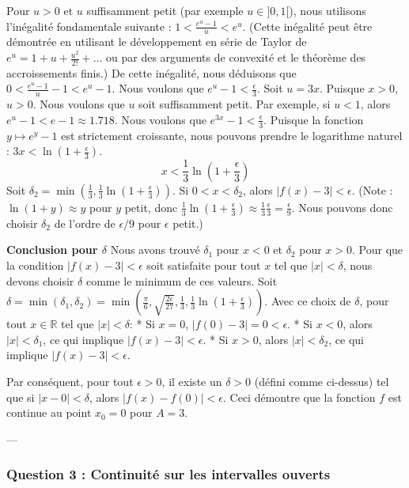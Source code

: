 \documentclass[12pt,a4paper]{report}
\begin{document}
Pour $u > 0$ et $u$ suffisamment petit (par exemple $u \in ]0, 1[$), nous utilisons l'inégalité fondamentale suivante :
$1 < \frac{e^u - 1}{u} < e^u$.
(Cette inégalité peut être démontrée en utilisant le développement en série de Taylor de $e^u = 1 + u + \frac{u^2}{2!} + \dots$ ou par des arguments de convexité et le théorème des accroissements finis.)
De cette inégalité, nous déduisons que $0 < \frac{e^u - 1}{u} - 1 < e^u - 1$.
Nous voulons que $e^u - 1 < \frac{\epsilon}{3}$.
Soit $u = 3x$. Puisque $x > 0$, $u > 0$.
Nous voulons que $u$ soit suffisamment petit. Par exemple, si $u < 1$, alors $e^u - 1 < e - 1 \approx 1.718$.
Nous voulons que $e^{3x} - 1 < \frac{\epsilon}{3}$.
Puisque la fonction $y \mapsto e^y - 1$ est strictement croissante, nous pouvons prendre le logarithme naturel :
$3x < \ln\left(1 + \frac{\epsilon}{3}\right)$.
$$ x < \frac{1}{3} \ln\left(1 + \frac{\epsilon}{3}\right) $$
Soit $\delta_2 = \min\left(\frac{1}{3}, \frac{1}{3} \ln\left(1 + \frac{\epsilon}{3}\right)\right)$. Si $0 < x < \delta_2$, alors $|f(x) - 3| < \epsilon$.
(Note : $\ln(1+y) \approx y$ pour $y$ petit, donc $\frac{1}{3} \ln(1+\frac{\epsilon}{3}) \approx \frac{1}{3} \frac{\epsilon}{3} = \frac{\epsilon}{9}$. Nous pouvons donc choisir $\delta_2$ de l'ordre de $\epsilon/9$ pour $\epsilon$ petit.)

\textbf{Conclusion pour $\delta$}
Nous avons trouvé $\delta_1$ pour $x<0$ et $\delta_2$ pour $x>0$.
Pour que la condition $|f(x) - 3| < \epsilon$ soit satisfaite pour tout $x$ tel que $|x| < \delta$, nous devons choisir $\delta$ comme le minimum de ces valeurs.
Soit $\delta = \min\left(\delta_1, \delta_2\right) = \min\left(\frac{\pi}{6}, \sqrt{\frac{2\epsilon}{27}}, \frac{1}{3}, \frac{1}{3} \ln\left(1 + \frac{\epsilon}{3}\right)\right)$.
Avec ce choix de $\delta$, pour tout $x \in \mathbb{R}$ tel que $|x| < \delta$:
*   Si $x=0$, $|f(0)-3|=0 < \epsilon$.
*   Si $x<0$, alors $|x| < \delta_1$, ce qui implique $|f(x)-3| < \epsilon$.
*   Si $x>0$, alors $|x| < \delta_2$, ce qui implique $|f(x)-3| < \epsilon$.

Par conséquent, pour tout $\epsilon > 0$, il existe un $\delta > 0$ (défini comme ci-dessus) tel que si $|x - 0| < \delta$, alors $|f(x) - f(0)| < \epsilon$.
Ceci démontre que la fonction $f$ est continue au point $x_0 = 0$ pour $A=3$.

---

\subsubsection{Question 3 : Continuité sur les intervalles ouverts}
\end{document}
